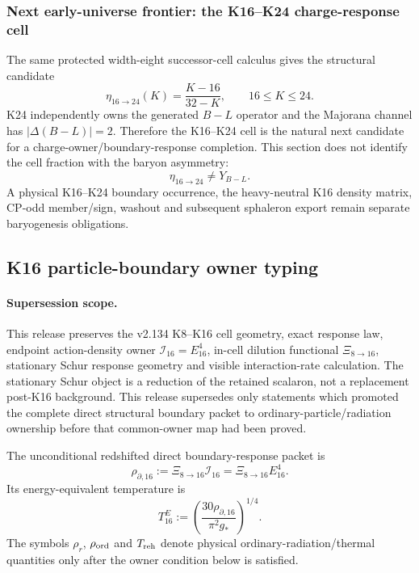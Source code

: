 \documentclass[12pt,a4paper]{article}
\begin{document}
\subsubsection{Next early-universe frontier: the K16--K24 charge-response cell}
\label{p8:subsec:v2134-k16-k24-frontier}
The same protected width-eight successor-cell calculus gives the structural
candidate
\[
 \boxed{\eta_{16\to24}(K)=\frac{K-16}{32-K}},
 \qquad16\le K\le24.
\]
K24 independently owns the generated $B-L$ operator and the Majorana channel
has $|\Delta(B-L)|=2$.  Therefore the K16--K24 cell is the natural next
candidate for a charge-owner/boundary-response completion.  This section does
not identify the cell fraction with the baryon asymmetry:
\[
 \boxed{\eta_{16\to24}\ne Y_{B-L}}.
\]
A physical K16--K24 boundary occurrence, the heavy-neutral K16 density matrix,
CP-odd member/sign, washout and subsequent sphaleron export remain separate
baryogenesis obligations.


\subsection{K16 particle-boundary owner typing}
\label{p8:sec:v2135-k16-particle-boundary-owner}

\paragraph{Supersession scope.}
This release preserves the v2.134 K8--K16 cell geometry, exact response law,
endpoint action-density owner $\mathcal I_{16}=E_{16}^4$, in-cell dilution
functional $\Xi_{8\to16}$, stationary Schur response geometry and visible
interaction-rate calculation.  The stationary Schur object is a reduction of
the retained scalaron, not a replacement post-K16 background.  This release
supersedes only statements which promoted the complete
direct structural boundary packet to ordinary-particle/radiation ownership
before that common-owner map had been proved.

\begin{definition}
\label{p8:def:v2135-typed-k16-boundary-packet}
The unconditional redshifted direct boundary-response packet is
\[
 \boxed{
 \rho_{\partial,16}
 :=\Xi_{8\to16}\mathcal I_{16}
 =\Xi_{8\to16}E_{16}^4.}
\]
Its energy-equivalent temperature is
\[
 \boxed{
 T_{16}^{E}
 :=\left(\frac{30\rho_{\partial,16}}{\pi^2g_\ast}\right)^{1/4}.}
\]
The symbols $\rho_r$, $\rho_{\rm ord}$ and $T_{\rm reh}$ denote physical
ordinary-radiation/thermal quantities only after the owner condition below is
satisfied.
\end{definition}
\end{document}
